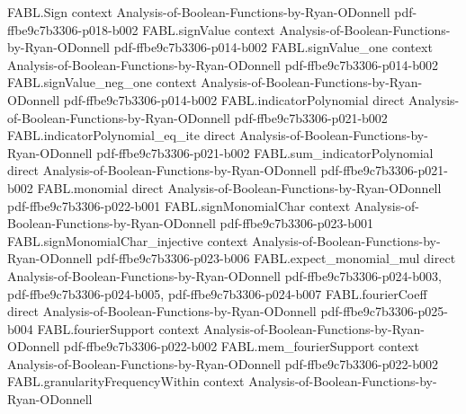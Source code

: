 \begin{theorem}
\label{FABL.fourierWeightAtLevel_majority_next_odd_eq}
\leanok
{}
\proofstep
  {FABL.Sign}
  {context}
  {Analysis-of-Boolean-Functions-by-Ryan-ODonnell}
  {pdf-ffbe9c7b3306-p018-b002}
\proofstep
  {FABL.signValue}
  {context}
  {Analysis-of-Boolean-Functions-by-Ryan-ODonnell}
  {pdf-ffbe9c7b3306-p014-b002}
\proofstep
  {FABL.signValue_one}
  {context}
  {Analysis-of-Boolean-Functions-by-Ryan-ODonnell}
  {pdf-ffbe9c7b3306-p014-b002}
\proofstep
  {FABL.signValue_neg_one}
  {context}
  {Analysis-of-Boolean-Functions-by-Ryan-ODonnell}
  {pdf-ffbe9c7b3306-p014-b002}
\proofstep
  {FABL.indicatorPolynomial}
  {direct}
  {Analysis-of-Boolean-Functions-by-Ryan-ODonnell}
  {pdf-ffbe9c7b3306-p021-b002}
\proofstep
  {FABL.indicatorPolynomial_eq_ite}
  {direct}
  {Analysis-of-Boolean-Functions-by-Ryan-ODonnell}
  {pdf-ffbe9c7b3306-p021-b002}
\proofstep
  {FABL.sum_indicatorPolynomial}
  {direct}
  {Analysis-of-Boolean-Functions-by-Ryan-ODonnell}
  {pdf-ffbe9c7b3306-p021-b002}
\proofstep
  {FABL.monomial}
  {direct}
  {Analysis-of-Boolean-Functions-by-Ryan-ODonnell}
  {pdf-ffbe9c7b3306-p022-b001}
\proofstep
  {FABL.signMonomialChar}
  {context}
  {Analysis-of-Boolean-Functions-by-Ryan-ODonnell}
  {pdf-ffbe9c7b3306-p023-b001}
\proofstep
  {FABL.signMonomialChar_injective}
  {context}
  {Analysis-of-Boolean-Functions-by-Ryan-ODonnell}
  {pdf-ffbe9c7b3306-p023-b006}
\proofstep
  {FABL.expect_monomial_mul}
  {direct}
  {Analysis-of-Boolean-Functions-by-Ryan-ODonnell}
  {pdf-ffbe9c7b3306-p024-b003,
    pdf-ffbe9c7b3306-p024-b005,
    pdf-ffbe9c7b3306-p024-b007}
\proofstep
  {FABL.fourierCoeff}
  {direct}
  {Analysis-of-Boolean-Functions-by-Ryan-ODonnell}
  {pdf-ffbe9c7b3306-p025-b004}
\proofstep
  {FABL.fourierSupport}
  {context}
  {Analysis-of-Boolean-Functions-by-Ryan-ODonnell}
  {pdf-ffbe9c7b3306-p022-b002}
\proofstep
  {FABL.mem_fourierSupport}
  {context}
  {Analysis-of-Boolean-Functions-by-Ryan-ODonnell}
  {pdf-ffbe9c7b3306-p022-b002}
\proofstep
  {FABL.granularityFrequencyWithin}
  {context}
  {Analysis-of-Boolean-Functions-by-Ryan-ODonnell}

\end{theorem}
